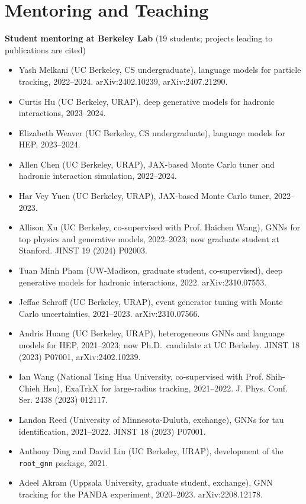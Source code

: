 \section*{Mentoring and Teaching}

\textbf{Student mentoring at Berkeley Lab} (19 students; projects leading to publications are cited)
\begin{itemize}
\item Yash Melkani (UC Berkeley, CS undergraduate), language models for particle tracking, 2022--2024. arXiv:2402.10239, arXiv:2407.21290.
\item Curtis Hu (UC Berkeley, URAP), deep generative models for hadronic interactions, 2023--2024.
\item Elizabeth Weaver (UC Berkeley, CS undergraduate), language models for HEP, 2023--2024.
\item Allen Chen (UC Berkeley, URAP), JAX-based Monte Carlo tuner and hadronic interaction simulation, 2022--2024.
\item Har Vey Yuen (UC Berkeley, URAP), JAX-based Monte Carlo tuner, 2022--2023.
\item Allison Xu (UC Berkeley, co-supervised with Prof. Haichen Wang), GNNs for top physics and generative models, 2022--2023; now graduate student at Stanford. JINST 19 (2024) P02003.
\item Tuan Minh Pham (UW-Madison, graduate student, co-supervised), deep generative models for hadronic interactions, 2022. arXiv:2310.07553.
\item Jeffae Schroff (UC Berkeley, URAP), event generator tuning with Monte Carlo uncertainties, 2021--2023. arXiv:2310.07566.
\item Andris Huang (UC Berkeley, URAP), heterogeneous GNNs and language models for HEP, 2021--2023; now Ph.D.\ candidate at UC Berkeley. JINST 18 (2023) P07001, arXiv:2402.10239.
\item Ian Wang (National Tsing Hua University, co-supervised with Prof. Shih-Chieh Hsu), ExaTrkX for large-radius tracking, 2021--2022. J. Phys. Conf. Ser. 2438 (2023) 012117.
\item Landon Reed (University of Minnesota-Duluth, exchange), GNNs for tau identification, 2021--2022. JINST 18 (2023) P07001.
\item Anthony Ding and David Lin (UC Berkeley, URAP), development of the \texttt{root\_gnn} package, 2021.
\item Adeel Akram (Uppsala University, graduate student, exchange), GNN tracking for the PANDA experiment, 2020--2023. arXiv:2208.12178.

\end{itemize}
